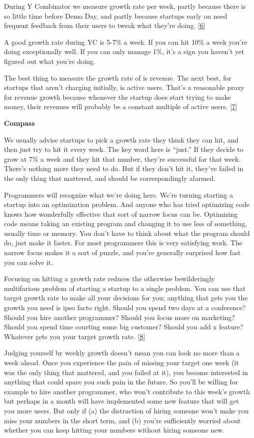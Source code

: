 During Y Combinator we measure growth rate per week, partly because
there is so little time before Demo Day, and partly because startups
early on need frequent feedback from their users to tweak what they're
doing. {[}\hyperref[f6n]{6}{]}

A good growth rate during YC is 5-7\% a week. If you can hit 10\% a week
you're doing exceptionally well. If you can only manage 1\%, it's a sign
you haven't yet figured out what you're doing.

The best thing to measure the growth rate of is revenue. The next best,
for startups that aren't charging initially, is active users. That's a
reasonable proxy for revenue growth because whenever the startup does
start trying to make money, their revenues will probably be a constant
multiple of active users. {[}\hyperref[f7n]{7}{]}

\textbf{Compass}

We usually advise startups to pick a growth rate they think they can
hit, and then just try to hit it every week. The key word here is
``just.'' If they decide to grow at 7\% a week and they hit that number,
they're successful for that week. There's nothing more they need to do.
But if they don't hit it, they've failed in the only thing that
mattered, and should be correspondingly alarmed.

Programmers will recognize what we're doing here. We're turning starting
a startup into an optimization problem. And anyone who has tried
optimizing code knows how wonderfully effective that sort of narrow
focus can be. Optimizing code means taking an existing program and
changing it to use less of something, usually time or memory. You don't
have to think about what the program should do, just make it faster. For
most programmers this is very satisfying work. The narrow focus makes it
a sort of puzzle, and you're generally surprised how fast you can solve
it.

Focusing on hitting a growth rate reduces the otherwise bewilderingly
multifarious problem of starting a startup to a single problem. You can
use that target growth rate to make all your decisions for you; anything
that gets you the growth you need is ipso facto right. Should you spend
two days at a conference? Should you hire another programmer? Should you
focus more on marketing? Should you spend time courting some big
customer? Should you add x feature? Whatever gets you your target growth
rate. {[}\hyperref[f8n]{8}{]}

Judging yourself by weekly growth doesn't mean you can look no more than
a week ahead. Once you experience the pain of missing your target one
week (it was the only thing that mattered, and you failed at it), you
become interested in anything that could spare you such pain in the
future. So you'll be willing for example to hire another programmer, who
won't contribute to this week's growth but perhaps in a month will have
implemented some new feature that will get you more users. But only if
(a) the distraction of hiring someone won't make you miss your numbers
in the short term, and (b) you're sufficiently worried about whether you
can keep hitting your numbers without hiring someone new.

